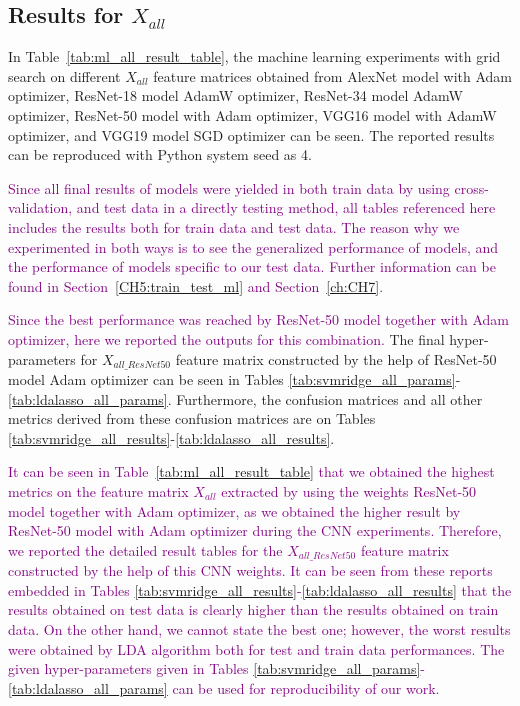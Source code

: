 \subsection{Results for $X_{all}$} \label{CH6:results_xall}

In Table~\ref{tab:ml_all_result_table}, the machine learning experiments with grid search on different $X_{all}$ feature matrices obtained from AlexNet model with Adam optimizer, ResNet-18 model AdamW optimizer, ResNet-34 model AdamW optimizer, ResNet-50 model with Adam optimizer, VGG16 model with AdamW optimizer, and VGG19 model SGD optimizer can be seen. The reported results can be reproduced with Python system seed as 4. 

\textcolor{purple}{Since all final results of models were yielded in both train data by using cross-validation, and test data in a directly testing method, all tables referenced here includes the results both for train data and test data. The reason why we experimented in both ways is to see the generalized performance of models, and the performance of models specific to our test data. Further information can be found in Section~\ref{CH5:train_test_ml} and Section~\ref{ch:CH7}.}

\textcolor{purple}{Since the best performance was reached by ResNet-50 model together with Adam optimizer, here we reported the outputs for this combination.} The final hyper-parameters for $X_{all\_ResNet50}$ feature matrix constructed by the help of ResNet-50 model Adam optimizer can be seen in Tables \ref{tab:svmridge_all_params}-\ref{tab:ldalasso_all_params}. Furthermore, the confusion matrices and all other metrics derived from these confusion matrices are on Tables \ref{tab:svmridge_all_results}-\ref{tab:ldalasso_all_results}.

\textcolor{purple}{It can be seen in Table~\ref{tab:ml_all_result_table} that we obtained the highest metrics on the feature matrix $X_{all}$ extracted by using the weights ResNet-50 model together with Adam optimizer, as we obtained the higher result by ResNet-50 model with Adam optimizer during the CNN experiments. Therefore, we reported the detailed result tables for the $X_{all\_ResNet50}$ feature matrix constructed by the help of this CNN weights. It can be seen from these reports embedded in Tables \ref{tab:svmridge_all_results}-\ref{tab:ldalasso_all_results} that the results obtained on test data is clearly higher than the results obtained on train data. On the other hand, we cannot state the best one; however, the worst results were obtained by LDA algorithm both for test and train data performances. The given hyper-parameters given in Tables \ref{tab:svmridge_all_params}-\ref{tab:ldalasso_all_params} can be used for reproducibility of our work.}


